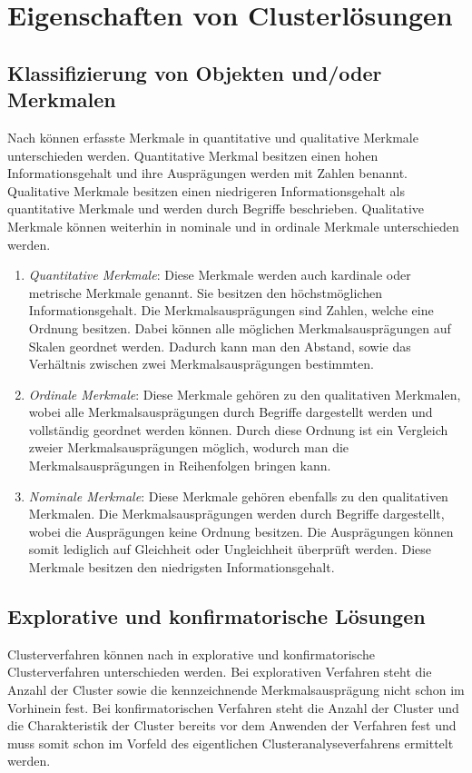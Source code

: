 \chapter{Eigenschaften von Clusterlösungen}

\section{Klassifizierung von Objekten und/oder Merkmalen}
Nach \citet[S. 158-163]{Bankhofer.2008} können erfasste Merkmale in quantitative und qualitative Merkmale unterschieden werden.
Quantitative Merkmal besitzen einen hohen Informationsgehalt und ihre Ausprägungen werden mit Zahlen benannt. Qualitative Merkmale besitzen einen niedrigeren Informationsgehalt als quantitative Merkmale und werden durch Begriffe beschrieben. Qualitative Merkmale können weiterhin in nominale und in ordinale Merkmale unterschieden werden.

\begin{enumerate}
        \item \textit{Quantitative Merkmale}: Diese Merkmale werden auch kardinale oder metrische Merkmale genannt. Sie besitzen den höchstmöglichen Informationsgehalt. Die Merkmalsausprägungen sind Zahlen, welche eine Ordnung besitzen. Dabei können alle möglichen Merkmalsausprägungen auf Skalen geordnet werden. Dadurch kann man den Abstand, sowie das Verhältnis zwischen zwei Merkmalsausprägungen bestimmten.
        \item \textit{Ordinale Merkmale}: Diese Merkmale gehören zu den qualitativen Merkmalen, wobei alle Merkmalsausprägungen durch Begriffe dargestellt werden und vollständig geordnet werden können. Durch diese Ordnung ist ein Vergleich zweier Merkmalsausprägungen möglich, wodurch man die Merkmalsausprägungen in Reihenfolgen bringen kann.
        \item \textit{Nominale Merkmale}: Diese Merkmale gehören ebenfalls zu den qualitativen Merkmalen. Die Merkmalsausprägungen werden durch Begriffe dargestellt, wobei die Ausprägungen keine Ordnung besitzen. Die Ausprägungen können somit lediglich auf Gleichheit oder Ungleichheit überprüft werden. Diese Merkmale besitzen den niedrigsten Informationsgehalt.
\end{enumerate}

\section{Explorative und konfirmatorische Lösungen}
Clusterverfahren können nach \citet[S. 22]{Bacher.2010} in explorative und konfirmatorische Clusterverfahren unterschieden werden. 
Bei explorativen Verfahren steht die Anzahl der Cluster sowie die kennzeichnende Merkmalsausprägung nicht schon im Vorhinein fest.
Bei konfirmatorischen Verfahren steht die Anzahl der Cluster und die Charakteristik der Cluster bereits vor dem Anwenden der Verfahren fest und muss somit schon im Vorfeld des eigentlichen Clusteranalyseverfahrens ermittelt werden.

